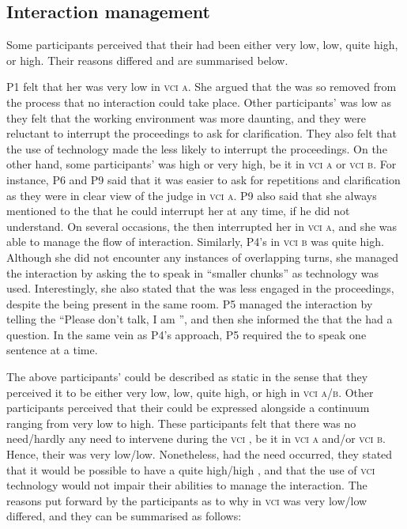 \documentclass[output=paper]{langsci/langscibook}
\begin{document}
\subsection{Interaction management} 

Some participants perceived that their  had been either very low, low, quite high, or high. Their reasons differed and are summarised below. 

P1 felt that her  was very low in \textsc{vci a}. She argued that the  was so removed from the process that no interaction could take place. Other participants’  was low as they felt that the working environment was more daunting, and they were reluctant to interrupt the proceedings to ask for clarification. They also felt that the use of technology made the  less likely to interrupt the proceedings. On the other hand, some participants’  was high or very high, be it in \textsc{vci a} or \textsc{vci b}. For instance, P6 and P9 said that it was easier to ask for repetitions and clarification as they were in clear view of the judge in \textsc{vci a}. P9 also said that she always mentioned to the  that he could interrupt her at any time, if he did not understand. On several occasions, the  then interrupted her in \textsc{vci a}, and she was able to manage the flow of interaction. Similarly, P4’s  in \textsc{vci b} was quite high. Although she did not encounter any instances of overlapping turns, she managed the interaction by asking the  to speak in “smaller chunks” as technology was used. Interestingly, she also stated that the  was less engaged in the proceedings, despite the  being present in the same room. P5 managed the interaction by telling the  “Please don’t talk, I am ”, and then she informed the  that the  had a question. In the same vein as P4’s approach, P5 required the  to speak one sentence at a time. 

The above participants’  could be described as static in the sense that they perceived it to be either very low, low, quite high, or high in \textsc{vci a\slash b}. Other participants perceived that their  could be expressed alongside a continuum ranging from very low to high. These participants felt that there was no need/hardly any need to intervene during the \textsc{vci} , be it in \textsc{vci a} and/or \textsc{vci b}. Hence, their  was very low/low. Nonetheless, had the need occurred, they stated that it would be possible to have a quite high/high , and that the use of \textsc{vci} technology would not impair their abilities to manage the interaction. The reasons put forward by the participants as to why  in \textsc{vci} was very low/low differed, and they can be summarised as follows:
\end{document}
